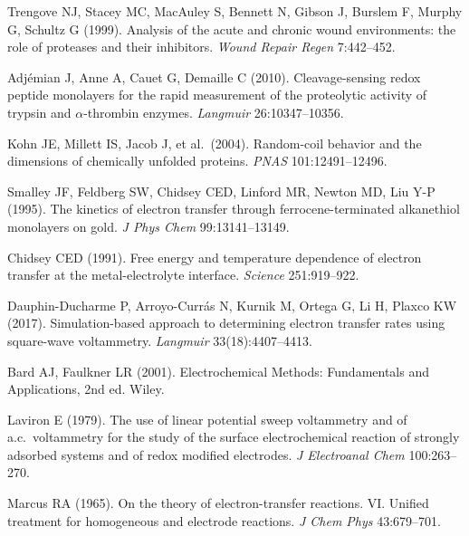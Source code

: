 \documentclass[10pt,a4paper]{article}
\numberwithin{equation}{section}
\begin{document}
\begin{enumerate}[label={[\arabic*]},noitemsep,leftmargin=*]
\item Trengove NJ, Stacey MC, MacAuley S, Bennett N, Gibson J, Burslem F,
  Murphy G, Schultz G (1999). Analysis of the acute and chronic wound
  environments: the role of proteases and their inhibitors.
  \textit{Wound Repair Regen} 7:442--452.

\item Adj\'emian J, Anne A, Cauet G, Demaille C (2010). Cleavage-sensing
  redox peptide monolayers for the rapid measurement of the proteolytic
  activity of trypsin and $\alpha$-thrombin enzymes.
  \textit{Langmuir} 26:10347--10356.

\item Kohn JE, Millett IS, Jacob J, et al.\ (2004). Random-coil behavior
  and the dimensions of chemically unfolded proteins.
  \textit{PNAS} 101:12491--12496.

\item Smalley JF, Feldberg SW, Chidsey CED, Linford MR, Newton MD, Liu Y-P
  (1995). The kinetics of electron transfer through ferrocene-terminated
  alkanethiol monolayers on gold. \textit{J Phys Chem} 99:13141--13149.

\item Chidsey CED (1991). Free energy and temperature dependence of
  electron transfer at the metal-electrolyte interface.
  \textit{Science} 251:919--922.

\item Dauphin-Ducharme P, Arroyo-Curr\'as N, Kurnik M, Ortega G, Li H,
  Plaxco KW (2017). Simulation-based approach to determining electron
  transfer rates using square-wave voltammetry.
  \textit{Langmuir} 33(18):4407--4413.

\item Bard AJ, Faulkner LR (2001). Electrochemical Methods: Fundamentals
  and Applications, 2nd ed. Wiley.

\item Laviron E (1979). The use of linear potential sweep voltammetry and
  of a.c.\ voltammetry for the study of the surface electrochemical
  reaction of strongly adsorbed systems and of redox modified electrodes.
  \textit{J Electroanal Chem} 100:263--270.

\item Marcus RA (1965). On the theory of electron-transfer reactions.
  VI. Unified treatment for homogeneous and electrode reactions.
  \textit{J Chem Phys} 43:679--701.


\end{enumerate}
\end{document}
